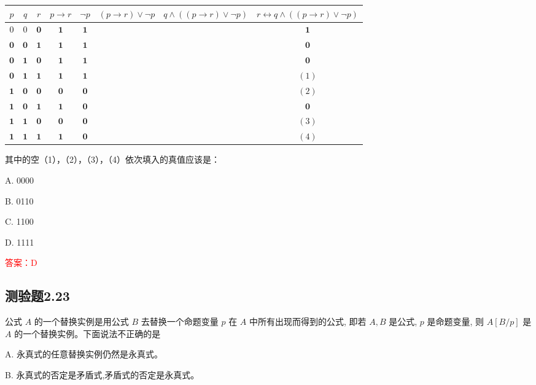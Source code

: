 \documentclass[UTF8, heading=true]{ctexart}
\begin{document}
\begin{table}[H]
  \centering
  \renewcommand{\arraystretch}{1.2}
\begin{tabular}{c|c|c|c|c|c|c|c}
\hline$p$ & $q$ & $r$ & $p \rightarrow r$ & $\neg p$ & $(p \rightarrow r) \vee \neg p$ & $q \wedge((p \rightarrow r) \vee \neg p)$ & $r \leftrightarrow q \wedge((p \rightarrow r) \vee \neg p)$ \\
\hline 0 & 0 & $\mathbf{0}$ & $\mathbf{1}$ & $\mathbf{1}$ & & & $\mathbf{1}$ \\
\hline $\mathbf{0}$ & $\mathbf{0}$ & $\mathbf{1}$ & $\mathbf{1}$ & $\mathbf{1}$ & & & $\mathbf{0}$ \\
\hline $\mathbf{0}$ & $\mathbf{1}$ & $\mathbf{0}$ & $\mathbf{1}$ & $\mathbf{1}$ & & & $\mathbf{0}$ \\
\hline $\mathbf{0}$ & $\mathbf{1}$ & $\mathbf{1}$ & $\mathbf{1}$ & $\mathbf{1}$ & & & $(1)$ \\
\hline $\mathbf{1}$ & $\mathbf{0}$ & $\mathbf{0}$ & $\mathbf{0}$ & $\mathbf{0}$ & & & $(2)$ \\
\hline $\mathbf{1}$ & $\mathbf{0}$ & $\mathbf{1}$ & $\mathbf{1}$ & $\mathbf{0}$ & & & $\mathbf{0}$ \\
\hline $\mathbf{1}$ & $\mathbf{1}$ & $\mathbf{0}$ & $\mathbf{0}$ & $\mathbf{0}$ & & & $(3)$ \\
\hline $\mathbf{1}$ & $\mathbf{1}$ & $\mathbf{1}$ & $\mathbf{1}$ & $\mathbf{0}$ & & & $(4)$ \\
\hline
\end{tabular}
\end{table}

其中的空（1），（2），（3），（4）依次填入的真值应该是： $\qquad$

A. 
0000

B. 
0110

C. 
1100

D. 
1111

\textcolor{red}{答案：D}


\subsection{测验题2.23}

公式 $A$ 的一个替换实例是用公式 $B$ 去替换一个命题变量 $p$ 在 $A$ 中所有出现而得到的公式, 即若 $A, B$ 是公式, $p$ 是命题变量, 则 $A[B / p]$ 是 $A$ 的一个替换实例。下面说法不正确的是 $\qquad$

A. 永真式的任意替换实例仍然是永真式。

B. 永真式的否定是矛盾式,矛盾式的否定是永真式。
\end{document}
